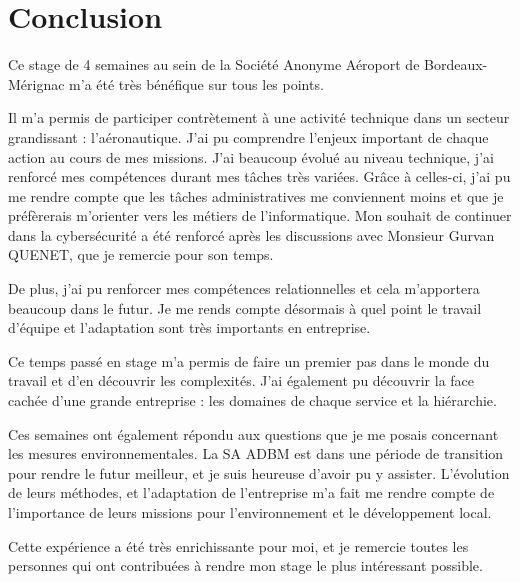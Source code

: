 \chapter{Conclusion}

Ce stage de 4 semaines au sein de la Société Anonyme Aéroport de Bordeaux-Mérignac m’a été très bénéfique sur tous les points.\newline

Il m'a permis de participer contrètement à une activité technique dans un secteur grandissant : l'aéronautique. J'ai pu comprendre l'enjeux important de chaque action au cours de mes missions. J'ai beaucoup évolué au niveau technique, j'ai renforcé mes compétences durant mes tâches très variées. Grâce à celles-ci, j'ai pu me rendre compte que les tâches administratives me conviennent moins et que je préfèrerais m'orienter vers les métiers de l'informatique. Mon souhait de continuer dans la cybersécurité a été renforcé après les discussions avec Monsieur Gurvan QUENET, que je remercie pour son temps.

De plus, j'ai pu renforcer mes compétences relationnelles et cela m'apportera beaucoup dans le futur. Je me rends compte désormais à quel point le travail d'équipe et l'adaptation sont très importants en entreprise.

Ce temps passé en stage m’a permis de faire un premier pas dans le monde du travail et d’en découvrir les complexités. J’ai également pu découvrir la face cachée d’une grande entreprise : les domaines de chaque service et la hiérarchie.

Ces semaines ont également répondu aux questions que je me posais concernant les mesures environnementales. La SA ADBM est dans une période de transition pour rendre le futur meilleur, et je suis heureuse d'avoir pu y assister. L'évolution de leurs méthodes, et l'adaptation de l'entreprise m'a fait me rendre compte de l'importance de leurs missions pour l'environnement et le développement local.\newline

Cette expérience a été très enrichissante pour moi, et je remercie toutes les personnes qui ont contribuées à rendre mon stage le plus intéressant possible.
